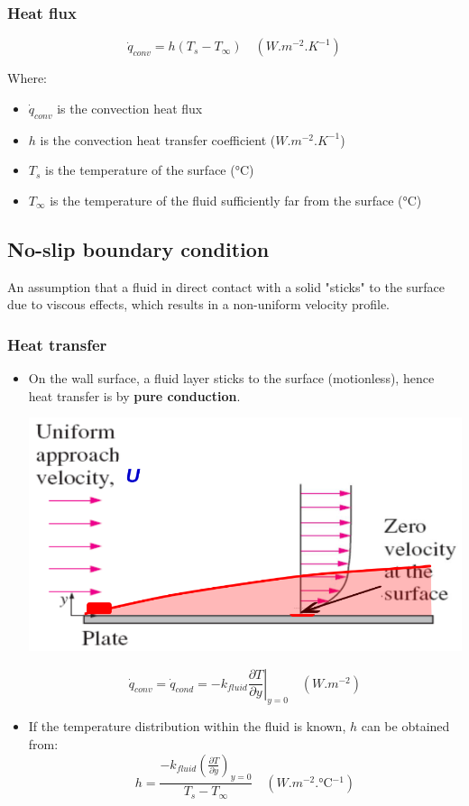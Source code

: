 \documentclass[11pt]{article}
\begin{document}
\subsubsection{Heat flux}
\label{sec:org7e1bd89}
\[\dot{q}_{conv} = h (T_s - T_{\infty}) \quad (\unit{W.m^{-2}.K^{-1}})\]

Where:
\begin{itemize}
\item \(\dot{q}_{conv}\) is the convection heat flux
\item \(h\) is the convection heat transfer coefficient (\(\unit{W.m^{-2}.K^{-1}}\))
\item \(T_s\) is the temperature of the surface (\(\unit{\degreeCelsius}\))
\item \(T_{\infty}\) is the temperature of the fluid sufficiently far from the surface (\(\unit{\degreeCelsius}\))
\end{itemize}

 \newpage

\subsection{No-slip boundary condition}
\label{sec:org99b46f1}
An assumption that a fluid in direct contact with a solid "sticks" to the surface due to viscous effects, which results in a non-uniform velocity profile.

\subsubsection{Heat transfer}
\label{sec:org2084872}
\begin{itemize}
\item On the wall surface, a fluid layer sticks to the surface (motionless), hence heat transfer is by \textbf{pure conduction}.
\begin{center}
\includegraphics[width=.9\linewidth]{./images/no-slip-boundary-condition-diagram.png}
\end{center}

\[\dot{q}_{conv} = \dot{q}_{cond} = - k_{fluid} \left. \frac{\partial T}{\partial y} \right|_{y = 0} \quad (\unit{W.m^{-2}})\]

\item If the temperature distribution within the fluid is known, \(h\) can be obtained from:
\[h = \frac{-k_{fluid} \left(\frac{\partial T}{\partial y} \right)_{y=0}}{T_s - T_{\infty}} \quad (\unit{W.m^{-2}.\degreeCelsius^{-1}})\]
\end{itemize}
\end{document}
